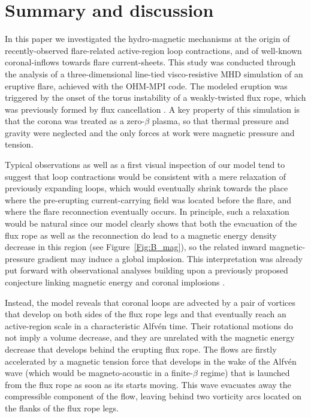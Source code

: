 \documentclass[apj]{emulateapj}
\begin{document}
\section{Summary and discussion}
\label{Sect:Discussion}

In this paper we investigated the hydro-magnetic mechanisms at the 
origin of recently-observed flare-related active-region loop contractions, 
and of well-known coronal-inflows towards flare current-sheets. This 
study was conducted through the analysis of a three-dimensional line-tied 
visco-resistive MHD simulation of an eruptive flare, achieved with the 
OHM-MPI code. The modeled eruption was triggered by the onset of the torus 
instability of a weakly-twisted flux rope, which was previously formed 
by flux cancellation \citep{Zuc2015}. A key property of this 
simulation is that the corona was treated as a zero-$\beta$ plasma, so 
that thermal pressure and gravity were neglected and the only forces at 
work were magnetic pressure and tension. 

Typical observations as well as a first visual inspection of our model 
tend to suggest that loop contractions would be consistent with a mere 
relaxation of previously expanding loops, which would eventually shrink 
towards the place where the pre-erupting current-carrying field was 
located before the flare, and where the flare reconnection eventually 
occurs. In principle, such a relaxation would be natural since our model 
clearly shows that both the evacuation of the flux rope as well as the 
reconnection do lead to a magnetic energy density decrease in this region 
(see Figure~\ref{Fig:B_mag}), so the related inward magnetic-pressure gradient 
may induce a global implosion. This interpretation was already put forward 
with observational analyses \citep[e.g.][]{Russell15,Wang2016} building 
upon a previously proposed conjecture linking magnetic energy and coronal 
implosions \citep{Hudson00}.

Instead, the model reveals that coronal loops are advected by a pair 
of vortices that develop on both sides of the flux rope legs and that 
eventually reach an active-region scale in a characteristic Alfv\'{e}n
 time. Their rotational motions do not imply a volume decrease, and they 
are unrelated with the magnetic energy decrease that develops behind 
the erupting flux rope. The flows are firstly accelerated by a magnetic 
tension force that develops in the wake of the Alfv\'{e}n wave (which would be 
magneto-acoustic in a finite-$\beta$ regime) that is launched from the 
flux rope as soon as its starts moving. This wave %
evacuates away the compressible component of the flow, leaving behind two vorticity arcs located on the flanks of the flux rope legs. 
\end{document}
